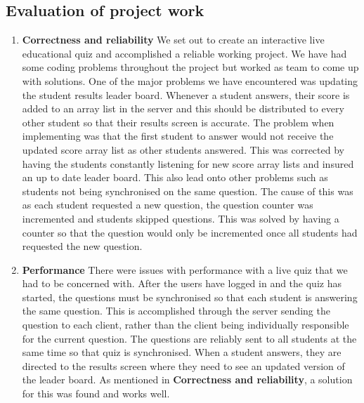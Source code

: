 \subsection{Evaluation of project work}
\label{sub:evaluation_of_project_work}

\begin{enumerate}

	\item \textbf{Correctness and reliability}
		We set out to create an interactive live educational quiz and accomplished a
		reliable working project. We have had some coding problems throughout the 
		project but worked as team to come up with solutions. One of the major problems 
		we have encountered was updating the student results leader board. Whenever
		a student answers, their score is added	to an array list in the server and this
		should be distributed to every other student so that their results screen is
		accurate. The problem when implementing was that the first student to answer
		would not receive the updated score array list as other students answered.
		This was corrected by having the students constantly listening for new score
		array lists and insured an up to date leader board. This also lead onto other
		problems such as students not being synchronised on the same question. The cause
		of this was as each student requested a new question, the question counter was
		incremented and students skipped questions. This was solved by having a counter
		so that the question would only be incremented once all students had requested the
		new question.
	
	\item \textbf{Performance}
		There were issues with performance with a live quiz that we had to be concerned with.
		After the users have logged in and the quiz has started, the questions must be 
		synchronised so that each student is answering the same question. This is accomplished 
		through the server sending the question to each client, rather than the client being 
		individually responsible for the current question. The questions are reliably sent to all 
		students at the same time so that quiz is synchronised. When a student answers, they are 
		directed to the results screen where they need to see an updated version of the leader board. 
		As mentioned in \textbf{Correctness and reliability}, a solution for this was found and works well.


\end{enumerate}
